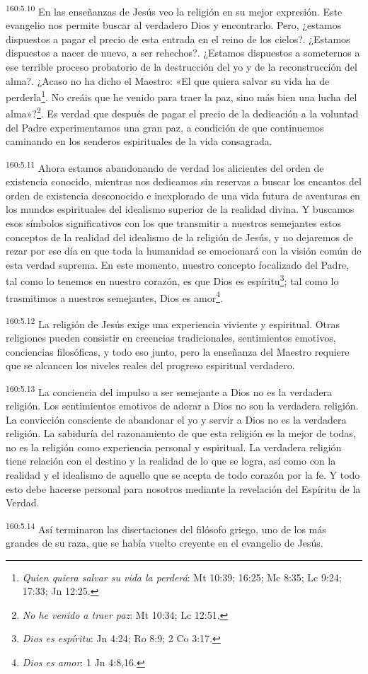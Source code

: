 \par
\textsuperscript{160:5.10} En las enseñanzas de Jesús veo la religión en su mejor expresión. Este evangelio nos permite buscar al verdadero Dios y encontrarlo. Pero, ¿estamos dispuestos a pagar el precio de esta entrada en el reino de los cielos?. ¿Estamos dispuestos a nacer de nuevo, a ser rehechos?. ¿Estamos dispuestos a someternos a ese terrible proceso probatorio de la destrucción del yo y de la reconstrucción del alma?. ¿Acaso no ha dicho el Maestro: «El que quiera salvar su vida ha de perderla\footnote{\textit{Quien quiera salvar su vida la perderá}: Mt 10:39; 16:25; Mc 8:35; Lc 9:24; 17:33; Jn 12:25.}. No creáis que he venido para traer la paz, sino más bien una lucha del alma»?\footnote{\textit{No he venido a traer paz}: Mt 10:34; Lc 12:51.}. Es verdad que después de pagar el precio de la dedicación a la voluntad del Padre experimentamos una gran paz, a condición de que continuemos caminando en los senderos espirituales de la vida consagrada.

\par
\textsuperscript{160:5.11} Ahora estamos abandonando de verdad los alicientes del orden de existencia conocido, mientras nos dedicamos sin reservas a buscar los encantos del orden de existencia desconocido e inexplorado de una vida futura de aventuras en los mundos espirituales del idealismo superior de la realidad divina. Y buscamos esos símbolos significativos con los que transmitir a nuestros semejantes estos conceptos de la realidad del idealismo de la religión de Jesús, y no dejaremos de rezar por ese día en que toda la humanidad se emocionará con la visión común de esta verdad suprema. En este momento, nuestro concepto focalizado del Padre, tal como lo tenemos en nuestro corazón, es que Dios es espíritu\footnote{\textit{Dios es espíritu}: Jn 4:24; Ro 8:9; 2 Co 3:17.}; tal como lo trasmitimos a nuestros semejantes, Dios es amor\footnote{\textit{Dios es amor}: 1 Jn 4:8,16.}.

\par
\textsuperscript{160:5.12} La religión de Jesús exige una experiencia viviente y espiritual. Otras religiones pueden consistir en creencias tradicionales, sentimientos emotivos, conciencias filosóficas, y todo eso junto, pero la enseñanza del Maestro requiere que se alcancen los niveles reales del progreso espiritual verdadero.

\par
\textsuperscript{160:5.13} La conciencia del impulso a ser semejante a Dios no es la verdadera religión. Los sentimientos emotivos de adorar a Dios no son la verdadera religión. La convicción consciente de abandonar el yo y servir a Dios no es la verdadera religión. La sabiduría del razonamiento de que esta religión es la mejor de todas, no es la religión como experiencia personal y espiritual. La verdadera religión tiene relación con el destino y la realidad de lo que se logra, así como con la realidad y el idealismo de aquello que se acepta de todo corazón por la fe. Y todo esto debe hacerse personal para nosotros mediante la revelación del Espíritu de la Verdad.

\par
\textsuperscript{160:5.14} Así terminaron las disertaciones del filósofo griego, uno de los más grandes de su raza, que se había vuelto creyente en el evangelio de Jesús.